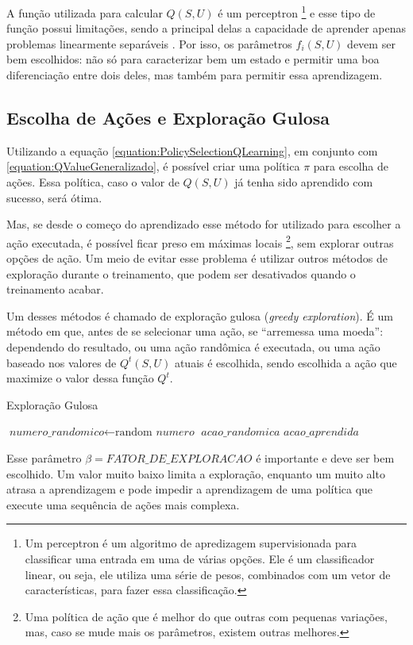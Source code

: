 A função utilizada para calcular $ Q \left( S, U \right) $ é um perceptron%
\footnote{Um perceptron é um algoritmo de apredizagem supervisionada para classificar uma entrada em uma de várias opções. Ele é um classificador linear, ou seja, ele utiliza uma série de pesos, combinados com um vetor de características, para fazer essa classificação.%
} e esse tipo de função possui limitações, sendo a principal delas a capacidade de aprender apenas problemas linearmente separáveis \cite{Haykin:1998:NNC:521706,priddy2005artificial}. Por isso, os parâmetros $ f_i \left( S, U \right) $ devem ser bem escolhidos: não só para caracterizar bem um estado e permitir uma boa diferenciação entre dois deles, mas também para permitir essa aprendizagem.

\subsection{Escolha de Ações e Exploração Gulosa} \label{subsection:EscolhaDeAçõesExploraçãoGulosa}

Utilizando a equação \ref{equation:PolicySelectionQLearning}, em conjunto com \ref{equation:QValueGeneralizado}, é possível criar uma política $ \pi $ para escolha de ações. Essa política, caso o valor de $ Q \left( S, U \right) $ já tenha sido aprendido com sucesso, será ótima.

Mas, se desde o começo do aprendizado esse método for utilizado para escolher a ação executada, é possível ficar preso em máximas locais%
\footnote{Uma política de ação que é melhor do que outras com pequenas variações, mas, caso se mude mais os parâmetros, existem outras melhores.%
}, sem explorar outras opções de ação. Um meio de evitar esse problema é utilizar outros métodos de exploração durante o treinamento, que podem ser desativados quando o treinamento acabar. 

Um desses métodos é chamado de exploração gulosa (\textit{greedy exploration}). É um método em que, antes de se selecionar uma ação, se ``arremessa uma moeda'': dependendo do resultado, ou uma ação randômica é executada, ou uma ação baseado nos valores de $ Q^t \left( S, U \right) $ atuais é escolhida, sendo escolhida a ação que maximize o valor dessa função $ Q^t $.

\begin{algorithm}[H]
	\caption{Exploração Gulosa} \label{euclid}
	\begin{algorithmic}[1]
			\State $\textit{numero\_randomico} \gets \text{random }\textit{numero}$
				\State \Return $\textit{acao\_randomica}$
			\Else
				\State \Return $\textit{acao\_aprendida}$
			\EndIf
		\EndProcedure
	\end{algorithmic}
\end{algorithm}

Esse parâmetro $ \beta = \textit{FATOR\_DE\_EXPLORACAO} $ é importante e deve ser bem escolhido. Um valor muito baixo limita a exploração, enquanto um muito alto atrasa a aprendizagem e pode impedir a aprendizagem de uma política que execute uma sequência de ações mais complexa.
